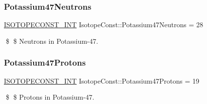 \subsubsection{\texorpdfstring{Potassium47\+Neutrons}{Potassium47Neutrons}}
{\footnotesize\ttfamily \mbox{\hyperlink{group___isotope_const-_macros_ga5f18360b3e99483a35c32d789e62621c}{I\+S\+O\+T\+O\+P\+E\+C\+O\+N\+S\+T\+\_\+\+I\+NT}} Isotope\+Const\+::\+Potassium47\+Neutrons = 28}

\$ \$ Neutrons in Potassium-\/47. \mbox{\label{group___isotope_const-_potassium-_k47_gaad03dcbc9abfc0e340a7dcf739f40fcb}} 
\subsubsection{\texorpdfstring{Potassium47\+Protons}{Potassium47Protons}}
{\footnotesize\ttfamily \mbox{\hyperlink{group___isotope_const-_macros_ga5f18360b3e99483a35c32d789e62621c}{I\+S\+O\+T\+O\+P\+E\+C\+O\+N\+S\+T\+\_\+\+I\+NT}} Isotope\+Const\+::\+Potassium47\+Protons = 19}

\$ \$ Protons in Potassium-\/47. 